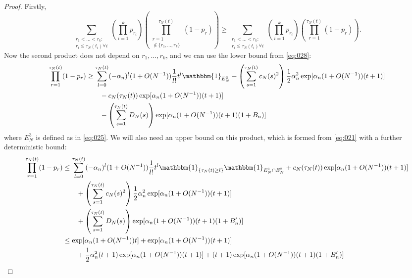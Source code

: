 \documentclass{article}
\newcommand{\I}[1]{\mathbbm{1}_{\{#1\}}}
\newcommand{\1}[1]{\mathbbm{1}_{#1}}
\begin{document}
\begin{proof}
Firstly,
\begin{equation}
\sum_{\substack{r_1 <\dots< r_k :\\ r_i \leq \tau_N(t_i) \forall i}}
        \left( \prod_{i=1}^k p_{r_i} \right)
        \left( \prod_{\substack{r=1 \\ \notin \{r_1,\dots,r_k\} }}^{\tau_N(t)} 
        (1-p_r) \right)
\geq \sum_{\substack{r_1 <\dots< r_k :\\ r_i \leq \tau_N(t_i) \forall i}}
        \left( \prod_{i=1}^k p_{r_i} \right)
        \left( \prod_{r=1}^{\tau_N(t)} 
        (1-p_r) \right) . \label{eq:032a}
\end{equation}
Now the second product does not depend on $r_1,\dots,r_k$, and we can use the lower bound from \eqref{eq:028}:
\begin{align}
\prod_{r=1}^{\tau_N(t)} (1-p_r)
&\geq \sum_{l=0}^{\tau_N(t)} (-\alpha_n)^l (1+O(N^{-1})) 
        \frac{1}{l!} t^l \1{E_N^3}
        - \left( \sum_{s=1}^{\tau_N(t)} c_N(s)^2 \right)
        \frac{1}{2} \alpha_n^2 \exp[ \alpha_n (1+O(N^{-1})) (t+1) ]\notag\\
    &\qquad- c_N(\tau_N(t)) \exp[ \alpha_n (1+O(N^{-1})) (t+1) ] \notag\\
    &\qquad- \left( \sum_{s=1}^{\tau_N(t)} D_N(s) \right)
        \exp[ \alpha_n (1+O(N^{-1})) (t+1) (1+B_n) ] \label{eq:033a}
\end{align}
where $E_N^3$ is defined as in \eqref{eq:025}.
We will also need an upper bound on this product, which is formed from \eqref{eq:021} with a further deterministic bound:
\begin{align}
\prod_{r=1}^{\tau_N(t)} (1-p_r)
&\leq \sum_{l=0}^{\tau_N(t)} (-\alpha_n)^l (1+O(N^{-1})) \frac{1}{l!} t^l
        \I{\tau_N(t) \geq l} \1{E_N^1 \cap E_N^2}
        + c_N(\tau_N(t)) \exp[ \alpha_n (1+O(N^{-1})) (t+1) ] \notag\\
    &\qquad+ \left( \sum_{s=1}^{\tau_N(t)} c_N(s)^2 \right)
        \frac{1}{2} \alpha_n^2 \exp[ \alpha_n (1+O(N^{-1})) (t+1) ] \notag\\
    &\qquad+ \left( \sum_{s=1}^{\tau_N(t)} D_N(s) \right)
        \exp[ \alpha_n (1+O(N^{-1})) (t+1) (1+B_n^\prime) ] \notag\\
&\leq \exp[ \alpha_n (1+O(N^{-1})) t ]
        + \exp[ \alpha_n (1+O(N^{-1})) (t+1) ]  \notag\\
    &\qquad+ \frac{1}{2} \alpha_n^2 (t+1)
        \exp[ \alpha_n (1+O(N^{-1})) (t+1) ]
        + (t+1) \exp[ \alpha_n (1+O(N^{-1})) (t+1) (1+B_n^\prime) ] \notag\\

\end{align}
\end{proof}
\end{document}
